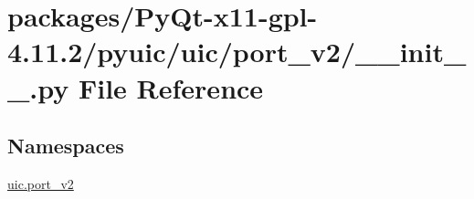 \hypertarget{packages_2PyQt-x11-gpl-4_811_82_2pyuic_2uic_2port__v2_2____init_____8py}{}\section{packages/\+Py\+Qt-\/x11-\/gpl-\/4.11.2/pyuic/uic/port\+\_\+v2/\+\_\+\+\_\+init\+\_\+\+\_\+.py File Reference}
\label{packages_2PyQt-x11-gpl-4_811_82_2pyuic_2uic_2port__v2_2____init_____8py}
\subsection*{Namespaces}
\begin{DoxyCompactItemize}
\item 
 \hyperlink{namespaceuic_1_1port__v2}{uic.\+port\+\_\+v2}
\end{DoxyCompactItemize}
